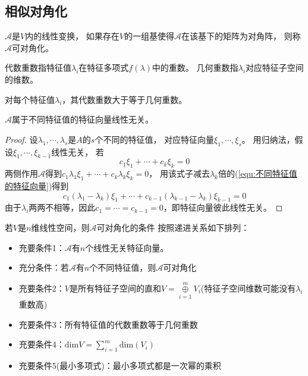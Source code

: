 \subsection{相似对角化}

\begin{definition}[相似对角化]
  $\mathcal{A}$是$V$内的线性变换，
  如果存在$V$的一组基使得$\mathcal{A}$在该基下的矩阵为对角阵，
  则称$\mathcal{A}$可对角化。
\end{definition}

\begin{definition}
  代数重数指特征值$\lambda_i$在特征多项式$f(\lambda)$中的重数。
  几何重数指$\lambda_i$对应特征子空间的维数。
\end{definition}

\begin{lemma}[代数重数与几何重数关系]
  对每个特征值$\lambda_i$，其代数重数大于等于几何重数。
\end{lemma}

\begin{lemma}[不同特征值的特征向量] \label{lemma:不同特征值的特征向量}
  $\mathcal{A}$属于不同特征值的特征向量线性无关。
\end{lemma}

\begin{proof}
  设$\lambda_1,\cdots,\lambda_s$是$A$的$s$个不同的特征值，
  对应特征向量$\xi_1,\cdots,\xi_s$。
  用归纳法，假设$\xi_1,\cdots,\xi_{k-1}$线性无关，
  若
  \begin{equation} \label{equ:不同特征值的特征向量}
    c_1\xi_1 + \cdots + c_k\xi_k = 0
  \end{equation}
  两侧作用$\mathcal{A}$得到$c_1\lambda_1\xi_1 + \cdots + c_k \lambda_k\xi_k = 0$，
  用该式子减去$\lambda_k$倍的(\ref{equ:不同特征值的特征向量})得到
  \begin{equation*}
    c_1(\lambda_1 - \lambda_k)\xi_1 + \cdots + c_{k-1}(\lambda_{k-1} - \lambda_k)\xi_{k-1} = 0
  \end{equation*}
  由于$\lambda_i$两两不相等，因此$c_1 = \cdots = c_{k-1} = 0$，即特征向量彼此线性无关。
\end{proof}

\begin{theorem}[可对角化条件]
  若$V$是$n$维线性空间，则$\mathcal{A}$可对角化的条件
  按照递进关系如下排列：
  \begin{itemize}
  \item 充要条件1：$\mathcal{A}$有$n$个线性无关特征向量。
  \item 充分条件：若$\mathcal{A}$有$n$个不同特征值，则$\mathcal{A}$可对角化
  \item 充要条件2：$V$是所有特征子空间的直和$V = \mathop{\oplus}\limits_{i = 1}^m V_i$(特征子空间维数可能没有$\lambda_i$重数高) 
  \item 充要条件3：所有特征值的代数重数等于几何重数
  \item 充要条件4：$\mathrm{dim} V = \sum\limits_{i = 1}^m \mathrm{dim}(V_i)$
  \item 充要条件5(最小多项式)：最小多项式都是一次幂的乘积
  \end{itemize}
\end{theorem}

